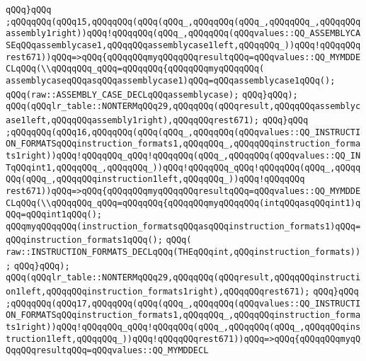 \verb|qQQq}qQQq|\newline
\verb|;qQQqqQQq(qQQq15,qQQqqQQq(qQQq(qQQq_,qQQqqQQq(qQQq_,qQQqqQQq_,qQQqqQQqassembly1right))qQQq!qQQqqQQq(qQQq_,qQQqqQQq(qQQqvalues::QQ_ASSEMBLYCASEqQQqassemblycase1,qQQqqQQqassemblycase1left,qQQqqQQq_))qQQq!qQQqqQQqrest671))qQQq=>qQQq{qQQqqQQqmyqQQqqQQqresultqQQq=qQQqvalues::QQ_MYMDDECLqQQq(\\qQQqqQQq_qQQq=qQQqqQQq{qQQqqQQqmyqQQqqQQq(|\newline
\verb|assemblycaseqQQqasqQQqassemblycase1)qQQq=qQQqassemblycase1qQQq();|\newline
\verb|qQQq(raw::ASSEMBLY_CASE_DECLqQQqassemblycase);|\newline
\verb|qQQq}qQQq);|\newline
\verb|qQQq(qQQqlr_table::NONTERMqQQq29,qQQqqQQq(qQQqresult,qQQqqQQqassemblycase1left,qQQqqQQqassembly1right),qQQqqQQqrest671);|\newline
\verb|qQQq}qQQq|\newline
\verb|;qQQqqQQq(qQQq16,qQQqqQQq(qQQq(qQQq_,qQQqqQQq(qQQqvalues::QQ_INSTRUCTION_FORMATSqQQqinstruction_formats1,qQQqqQQq_,qQQqqQQqinstruction_formats1right))qQQq!qQQqqQQq_qQQq!qQQqqQQq(qQQq_,qQQqqQQq(qQQqvalues::QQ_INTqQQqint1,qQQqqQQq_,qQQqqQQq_))qQQq!qQQqqQQq_qQQq!qQQqqQQq(qQQq_,qQQqqQQq(qQQq_,qQQqqQQqinstruction1left,qQQqqQQq_))qQQq!qQQqqQQq|\newline
\verb|rest671))qQQq=>qQQq{qQQqqQQqmyqQQqqQQqresultqQQq=qQQqvalues::QQ_MYMDDECLqQQq(\\qQQqqQQq_qQQq=qQQqqQQq{qQQqqQQqmyqQQqqQQq(intqQQqasqQQqint1)qQQq=qQQqint1qQQq();|\newline
\verb|qQQqmyqQQqqQQq(instruction_formatsqQQqasqQQqinstruction_formats1)qQQq=qQQqinstruction_formats1qQQq();|\newline
\verb|qQQq(|\newline
\verb|raw::INSTRUCTION_FORMATS_DECLqQQq(THEqQQqint,qQQqinstruction_formats));|\newline
\verb|qQQq}qQQq);|\newline
\verb|qQQq(qQQqlr_table::NONTERMqQQq29,qQQqqQQq(qQQqresult,qQQqqQQqinstruction1left,qQQqqQQqinstruction_formats1right),qQQqqQQqrest671);|\newline
\verb|qQQq}qQQq|\newline
\verb|;qQQqqQQq(qQQq17,qQQqqQQq(qQQq(qQQq_,qQQqqQQq(qQQqvalues::QQ_INSTRUCTION_FORMATSqQQqinstruction_formats1,qQQqqQQq_,qQQqqQQqinstruction_formats1right))qQQq!qQQqqQQq_qQQq!qQQqqQQq(qQQq_,qQQqqQQq(qQQq_,qQQqqQQqinstruction1left,qQQqqQQq_))qQQq!qQQqqQQqrest671))qQQq=>qQQq{qQQqqQQqmyqQQqqQQqresultqQQq=qQQqvalues::QQ_MYMDDECL|\newline
